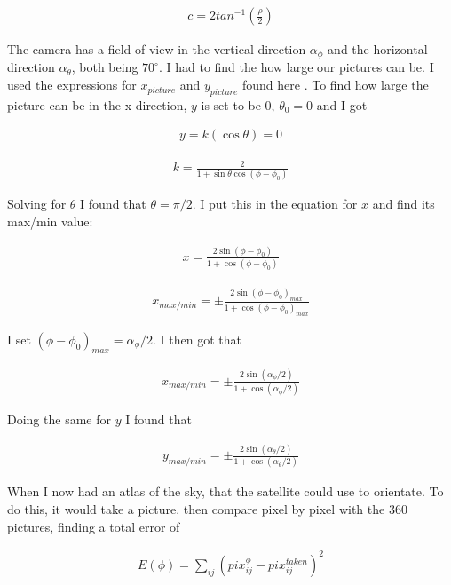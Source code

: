 \documentclass[a4paper, 10pt]{article}
\begin{document}
\begin{align}
c = 2tan^{-1} \left( \frac{\rho}{2} \right)
\end{align}


The camera has a field of view in the vertical direction $\alpha_{\phi}$ and the horizontal direction $\alpha_{\theta}$, both being $70^\circ$. I had to find the how large our pictures can be. I used the expressions for $x_{picture}$ and $y_{picture}$ found here \cite{part4}. To find how large the picture can be in the x-direction, $y$ is set to be $0$, $\theta_0 = 0$ and I got

\begin{align}
y = k(\cos \theta ) = 0
\end{align}

\begin{align}
k = \frac{2}{1+\sin \theta \cos (\phi - \phi_0)}
\end{align}

Solving for $\theta$ I found that $\theta = \pi/2$. I put this in the equation for $x$ and find its max/min value:

\begin{align}
x = \frac{2 \sin(\phi - \phi_0)}{1+\cos (\phi - \phi_0)}
\end{align}

\begin{align}
x_{max/min} = \pm \frac{2 \sin(\phi - \phi_0)_{max}}{1+\cos (\phi - \phi_0)_{max}}
\end{align}

I set $(\phi - \phi_0)_{max} = \alpha_{\phi}/2$. I then got that

\begin{align}
x_{max/min} = \pm \frac{2 \sin(\alpha_{\phi}/2)}{1+\cos (\alpha_{\phi}/2)}
\end{align}

Doing the same for $y$ I found that 

\begin{align}
y_{max/min} = \pm \frac{2 \sin(\alpha_{\theta}/2)}{1+\cos (\alpha_{\theta}/2)}
\end{align}


When I now had an atlas of the sky, that the satellite could use to orientate. To do this, it would take a picture. then compare pixel by pixel with the 360 pictures, finding a total error of
 
\begin{align}
E(\phi) = \sum_{ij}(pix_{ij}^{\phi} - pix_{ij}^{taken})^2
\end{align}
\end{document}
